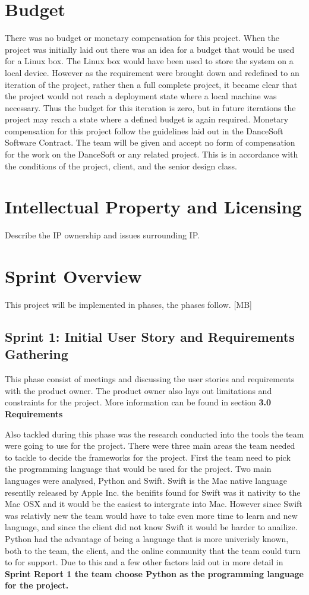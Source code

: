 \section{Budget}
There was no budget or monetary compensation for this project. When the project was initially laid out there was an idea for a budget that would be used for a Linux box. The Linux box would have been used to store the system on a local device. However as the requirement were brought down and redefined to an iteration of the project, rather then a full complete project, it became clear that the project would not reach a deployment state where a local machine was necessary. Thus the budget for this iteration is zero, but in future iterations the project may reach a state where a defined budget is again required. 
Monetary compensation for this project follow the guidelines laid out in the DanceSoft Software Contract. The team will be given and accept no form of compensation for the work on the DanceSoft or any related project. This is in accordance with the conditions of the project, client, and the senior design class.

\section{Intellectual Property and Licensing}
Describe the IP ownership and issues surrounding IP.

\section{Sprint  Overview}
This project will be implemented in phases, the phases follow. [MB]

\subsection{Sprint 1: Initial User Story and Requirements Gathering}
This phase consist of meetings and discussing the user stories and requirements with the product owner. The product owner also lays out limitations and constraints for the project. More information can be found in section \bf 3.0 Requirements \rm

Also tackled during this phase was the research conducted into the tools the team were going to use for the project. There were three main areas the team needed to tackle to decide the frameworks for the project. First the team need to pick the programming language that would be used for the project. Two main languages were analysed, Python and Swift. Swift is the Mac native language resentlly released by Apple Inc. the benifits found for Swift was it nativity to the Mac OSX and it would be the easiest to intergrate into Mac. However since Swift was relativly new the team would have to take even more time to learn and new language, and since the client did not know Swift it would be harder to anailize. Python had the advantage of being a language that is more univerisly known, both to the team, the client, and the online community that the team could turn to for support. Due to this and a few other factors laid out in more detail in \bf Sprint Report 1 \rm the team choose Python as the programming language for the project.

